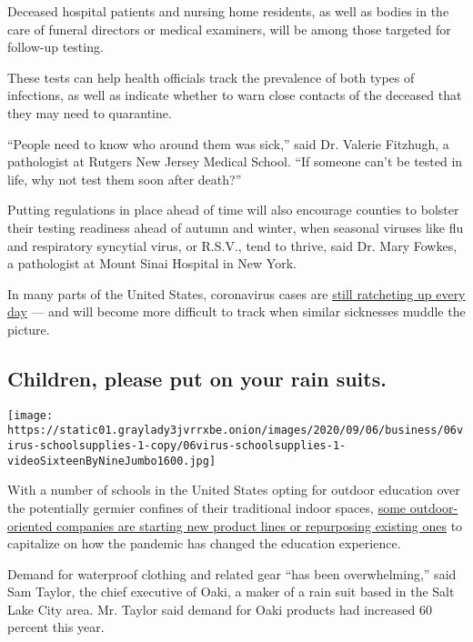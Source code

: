 Deceased hospital patients and nursing home residents, as well as bodies
in the care of funeral directors or medical examiners, will be among
those targeted for follow-up testing.

These tests can help health officials track the prevalence of both types
of infections, as well as indicate whether to warn close contacts of the
deceased that they may need to quarantine.

``People need to know who around them was sick,'' said Dr. Valerie
Fitzhugh, a pathologist at Rutgers New Jersey Medical School. ``If
someone can't be tested in life, why not test them soon after death?''

Putting regulations in place ahead of time will also encourage counties
to bolster their testing readiness ahead of autumn and winter, when
seasonal viruses like flu and respiratory syncytial virus, or R.S.V.,
tend to thrive, said Dr. Mary Fowkes, a pathologist at Mount Sinai
Hospital in New York.

In many parts of the United States, coronavirus cases are
\href{https://www.nytimes3xbfgragh.onion/interactive/2020/us/coronavirus-us-cases.html}{still
ratcheting up every day} --- and will become more difficult to track
when similar sicknesses muddle the picture.

\hypertarget{children-please-put-on-your-rain-suits}{%
\subsection{Children, please put on your rain
suits.}\label{children-please-put-on-your-rain-suits}}

\texttt{[image: https://static01.graylady3jvrrxbe.onion/images/2020/09/06/business/06virus-schoolsupplies-1-copy/06virus-schoolsupplies-1-videoSixteenByNineJumbo1600.jpg]}

With a number of schools in the United States opting for outdoor
education over the potentially germier confines of their traditional
indoor spaces,
\href{https://www.nytimes3xbfgragh.onion/2020/09/06/business/schools-outdoor-gear.html}{some
outdoor-oriented companies are starting new product lines or repurposing
existing ones} to capitalize on how the pandemic has changed the
education experience.

Demand for waterproof clothing and related gear ``has been
overwhelming,'' said Sam Taylor, the chief executive of Oaki, a maker of
a rain suit based in the Salt Lake City area. Mr. Taylor said demand for
Oaki products had increased 60 percent this year.

